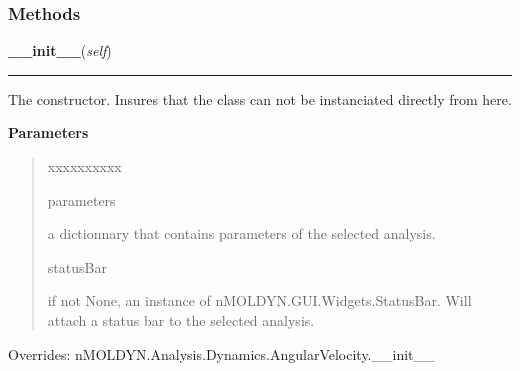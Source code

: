 
  \subsubsection{Methods}

    \vspace{0.5ex}

\hspace{.8\funcindent}\begin{boxedminipage}{\funcwidth}

    \raggedright \textbf{\_\_init\_\_}(\textit{self})

    \vspace{-1.5ex}

    \rule{\textwidth}{0.5\fboxrule}
\setlength{\parskip}{2ex}
    The constructor. Insures that the class can not be instanciated 
    directly from here.

\setlength{\parskip}{1ex}
      \textbf{Parameters}
      \vspace{-1ex}

      \begin{quote}
        \begin{Ventry}{xxxxxxxxxx}

          \item[parameters]

          a dictionnary that contains parameters of the selected analysis.

          \item[statusBar]

          if not None, an instance of nMOLDYN.GUI.Widgets.StatusBar. Will 
          attach a status bar to the selected analysis.

        \end{Ventry}

      \end{quote}

      Overrides: nMOLDYN.Analysis.Dynamics.AngularVelocity.\_\_init\_\_

    \end{boxedminipage}

    \label{nMOLDYN:Analysis:Dynamics:AngularVelocityAutoCorrelationFunction:initialize}

